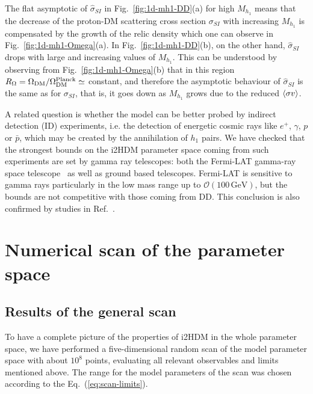 \documentclass[12pt,a4paper]{article}
\newcommand {\blue} {\color{blue}}
\newcommand{\giac}[2]{{\blue #1 #2}}
\begin{document}
The flat asymptotic of $\hat{\sigma}_{SI}$ in Fig.~\ref{fig:1d-mh1-DD}(a)
for high $M_{h_1}$ means that the decrease of the 
proton-DM scattering cross section ${\sigma}_{SI}$ with increasing $M_{h_1}$ is compensated by the 
growth of the relic density which one can observe in Fig.~\ref{fig:1d-mh1-Omega}(a).
{In Fig.~\ref{fig:1d-mh1-DD}(b), on the other hand, $\hat{\sigma}_{SI}$
drops with large and increasing values of $M_{h_1}$.
This can be understood by observing from Fig.~\ref{fig:1d-mh1-Omega}(b) that in this region
$R_\Omega = \Omega_{\rm DM}/\Omega^{\rm Planck}_{\rm DM}\simeq$ constant, and therefore 
the asymptotic behaviour of $\hat{\sigma}_{SI}$ is the same as for ${\sigma}_{SI}$,
that is, it goes down as $M_{h_1}$ grows due to the reduced $\mathinner{\langle{\sigma v}\rangle}$.}




A related question is whether the model can be better probed by   indirect detection (ID) experiments, i.e. the detection of   energetic cosmic rays like $e^+$, $\gamma$, $p$ or $\bar{p}$, which may be created by the annihilation of $h_1$ pairs.
We have checked  that the strongest bounds on the i2HDM parameter space
 coming from such experiments are set by gamma ray telescopes: both the Fermi-LAT gamma-ray space telescope~\cite{Ackermann:2011wa} as well as ground based telescopes. Fermi-LAT is sensitive to gamma rays particularly in the low mass range  up to $\mathcal{O}(100\,\mathrm{GeV})$, but the bounds are not competitive with those coming from DD. 
This conclusion is also confirmed by studies in Ref.~\cite{Arhrib:2013ela}.
 


%
\section{Numerical scan of the parameter space}

\subsection{Results of the general scan}

To have a complete picture of the properties of i2HDM in the whole parameter space, we have performed a
five-dimensional random scan of the model parameter space with about $10^8$ points, evaluating all relevant
observables and limits mentioned above. The range for 
the model parameters of the scan was chosen according to the Eq.~(\ref{eq:scan-limits}).
\end{document}
